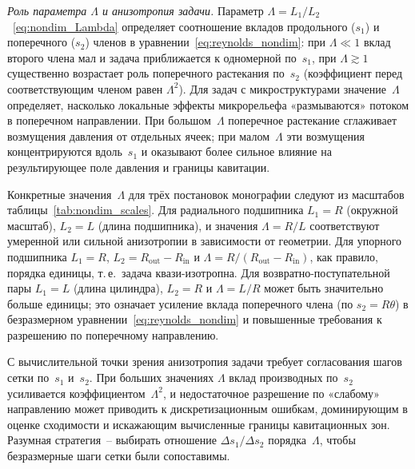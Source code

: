 \textit{Роль параметра $\Lambda$ и анизотропия задачи.}
Параметр
$\Lambda = L_1/L_2$~\eqref{eq:nondim_Lambda} определяет
соотношение вкладов продольного ($s_1$) и поперечного ($s_2$)
членов в уравнении~\eqref{eq:reynolds_nondim}:
при $\Lambda \ll 1$ вклад второго члена мал и задача
приближается к одномерной по~$s_1$, при $\Lambda \gtrsim 1$
существенно возрастает роль поперечного растекания по~$s_2$
(коэффициент перед соответствующим членом
равен $\Lambda^2$). Для задач с микроструктурами
значение~$\Lambda$ определяет, насколько локальные эффекты
микрорельефа «размываются» потоком в поперечном направлении.
При большом~$\Lambda$ поперечное растекание сглаживает
возмущения давления от отдельных ячеек; при малом~$\Lambda$
эти возмущения концентрируются вдоль~$s_1$ и оказывают более
сильное влияние на результирующее поле давления и границы
кавитации.

Конкретные значения~$\Lambda$ для трёх постановок монографии
следуют из масштабов таблицы~\ref{tab:nondim_scales}.
Для радиального подшипника $L_1 = R$ (окружной масштаб),
$L_2 = L$ (длина подшипника), и значения $\Lambda = R/L$
соответствуют умеренной или сильной анизотропии в зависимости
от геометрии. Для упорного подшипника $L_1 = R$,
$L_2 = R_{\mathrm{out}} - R_{\mathrm{in}}$
и $\Lambda = R/(R_{\mathrm{out}} - R_{\mathrm{in}})$, как
правило, порядка единицы, т.\,е.\ задача квази-изотропна.
Для возвратно-поступательной пары $L_1 = L$ (длина
цилиндра), $L_2 = R$ и $\Lambda = L/R$ может быть значительно
больше единицы; это означает усиление вклада поперечного члена
(по $s_2 = R\theta$) в безразмерном
уравнении~\eqref{eq:reynolds_nondim} и повышенные требования
к разрешению по поперечному направлению.

С вычислительной точки зрения анизотропия задачи требует
согласования шагов сетки по~$s_1$ и~$s_2$. При больших
значениях $\Lambda$ вклад производных по~$s_2$ усиливается
коэффициентом~$\Lambda^2$, и недостаточное разрешение
по «слабому» направлению может приводить
к дискретизационным ошибкам, доминирующим в оценке сходимости
и искажающим вычисленные границы кавитационных зон. Разумная
стратегия~-- выбирать отношение
$\Delta s_1/\Delta s_2$ порядка~$\Lambda$, чтобы
безразмерные шаги сетки были сопоставимы.

